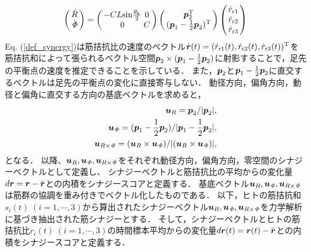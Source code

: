 \begin{eqnarray}
 \arraycolsep=1.5pt
 \left(
  \begin{array}{c}
   \dot{R} \\
   \dot{{\it \Phi}}
  \end{array}
 \right)
 =
 \left(
  \begin{array}{cc}
   -CL{\rm sin}\frac{\theta_{\rm k}}{2} & 0 \\
   0 & C
  \end{array}
 \right)
 \left(
  \begin{array}{c}
   \ve{p}_2^{\rm T} \\
   (\ve{p}_1-\frac{1}{2}\ve{p}_2)^{\rm T}
  \end{array}
 \right)
 \left(
  \begin{array}{c}
   \dot{r}_{{\rm r}1} \\
   \dot{r}_{{\rm r}2} \\
   \dot{r}_{{\rm r}3}
  \end{array}
 \right)
 \label{def_synergy}
\end{eqnarray}
Eq. (\ref{def_synergy})は筋拮抗比の速度のベクトル$\dot{\mbox{\boldmath{$r$}}}(t)=(\dot{r}_{{\rm r}1}(t),\dot{r}_{{\rm r}2}(t),\dot{r}_{{\rm r}3}(t))^{\rm T}$を筋拮抗和によって張られるベクトル空間$\mbox{\boldmath{$p$}}_2\times(\mbox{\boldmath{$p$}}_1-\frac{1}{2}\mbox{\boldmath{$p$}}_2)$に射影することで，足先の平衡点の速度を推定できることを示している．
また，$\mbox{\boldmath{$p$}}_2$と$\mbox{\boldmath{$p$}}_1-\frac{1}{2}\mbox{\boldmath{$p$}}_2$に直交するベクトルは足先の平衡点の変化に直接寄与しない．
動径方向，偏角方向，動径と偏角に直交する方向の基底ベクトルを求めると，
\begin{eqnarray}
 \mbox{\boldmath{$u$}}_R=\mbox{\boldmath{$p$}}_2/|\mbox{\boldmath{$p$}}_2|,\\
 \mbox{\boldmath{$u$}}_{\it \Phi}=(\mbox{\boldmath{$p$}}_1-\frac{1}{2}\mbox{\boldmath{$p$}}_2)/|\mbox{\boldmath{$p$}}_1-\frac{1}{2}\mbox{\boldmath{$p$}}_2|,\\
 \mbox{\boldmath{$u$}}_{R\times{\it \Phi}}=(\mbox{\boldmath{$u$}}_R\times\mbox{\boldmath{$u$}}_{\it \Phi})/|(\mbox{\boldmath{$u$}}_R\times\mbox{\boldmath{$u$}}_{\it \Phi})|,
\end{eqnarray}
となる．
以降、$\mbox{\boldmath{$u$}}_R,\mbox{\boldmath{$u$}}_{\it \Phi},\mbox{\boldmath{$u$}}_{R\times{\it \Phi}}$をそれぞれ動径方向，偏角方向，零空間のシナジーベクトルとして定義し、
シナジーベクトルと筋拮抗比の平均からの変化量$d\mbox{\boldmath{$r$}}=\mbox{\boldmath{$r$}}-\bar{\mbox{\boldmath{$r$}}}$との内積をシナジースコアと定義する．
基底ベクトル$\mbox{\boldmath{$u$}}_R,\mbox{\boldmath{$u$}}_{\it \Phi},\mbox{\boldmath{$u$}}_{R\times{\it \Phi}}$は筋群の協調を重み付きでベクトル化したものである．
以下，ヒトの筋拮抗和$s_i(t)\;(i=1,\cdots,3)$から算出されたシナジーベクトル$\mbox{\boldmath{$u$}}_R,\mbox{\boldmath{$u$}}_{\it \Phi},\mbox{\boldmath{$u$}}_{R\times{\it \Phi}}$を力学解析に基づき抽出された筋シナジーとする．
そして，シナジーベクトルとヒトの筋拮抗比$r_i(t)\;(i=1,\cdots,3)$の時間標本平均からの変化量$d\mbox{\boldmath{$r$}}(t)=\mbox{\boldmath{$r$}}(t)-\bar{\mbox{\boldmath{$r$}}}$との内積をシナジースコアと定義する．
